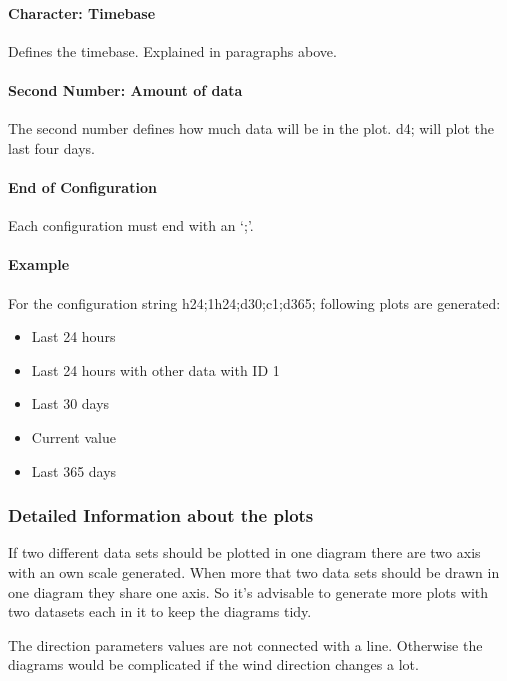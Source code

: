 \paragraph{Character: Timebase} %
\label{par:character}
Defines the timebase. Explained in paragraphs above.
\paragraph{Second Number: Amount of data} %
\label{par:number}
The second number defines how much data will be in the plot. {\C d4;} will plot the last four days.
\paragraph{End of Configuration} %
\label{par:end_of_configuration}
Each configuration must end with an {\C `;'}.

\paragraph{Example} %
\label{par:example}
For the configuration string {\C h24;1h24;d30;c1;d365;} following plots are generated:
\begin{itemize}
	\item Last 24 hours
	\item Last 24 hours with other data with ID 1 
	\item Last 30 days
	\item Current value
	\item Last 365 days
\end{itemize}


\subsubsection{Detailed Information about the plots} %
\label{ssub:detailed_information_about_the_plots}
If two different data sets should be plotted in one diagram there are two axis with an own scale generated. When more that two data sets should be drawn in one diagram they share one axis. So it's advisable to generate more plots with two datasets each in it to keep the diagrams tidy.

The direction parameters values are not connected with a line. Otherwise the diagrams would be complicated if the wind direction changes a lot.

